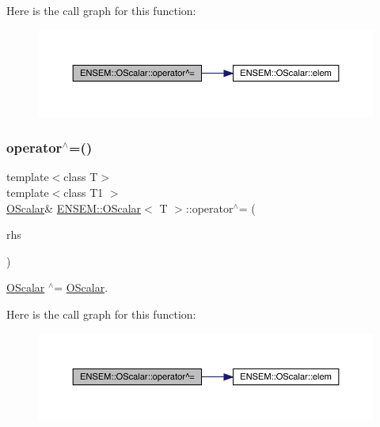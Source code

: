 Here is the call graph for this function\+:
\nopagebreak
\begin{figure}[H]
\begin{center}
\leavevmode
\includegraphics[width=350pt]{da/d80/classENSEM_1_1OScalar_af66decef8e6be220193ad1292a927e2f_cgraph}
\end{center}
\end{figure}
\mbox{\label{classENSEM_1_1OScalar_af66decef8e6be220193ad1292a927e2f}} 
\subsubsection{\texorpdfstring{operator$^\wedge$=()}{operator^=()}\hspace{0.1cm}{\footnotesize\ttfamily [2/3]}}
{\footnotesize\ttfamily template$<$class T$>$ \\
template$<$class T1 $>$ \\
\mbox{\hyperlink{classENSEM_1_1OScalar}{O\+Scalar}}\& \mbox{\hyperlink{classENSEM_1_1OScalar}{E\+N\+S\+E\+M\+::\+O\+Scalar}}$<$ T $>$\+::operator$^\wedge$= (\begin{DoxyParamCaption}\item[{const \mbox{\hyperlink{classENSEM_1_1OScalar}{O\+Scalar}}$<$ T1 $>$ \&}]{rhs }\end{DoxyParamCaption})\hspace{0.3cm}{\ttfamily [inline]}}



\mbox{\hyperlink{classENSEM_1_1OScalar}{O\+Scalar}} $^\wedge$= \mbox{\hyperlink{classENSEM_1_1OScalar}{O\+Scalar}}. 

Here is the call graph for this function\+:
\nopagebreak
\begin{figure}[H]
\begin{center}
\leavevmode
\includegraphics[width=350pt]{da/d80/classENSEM_1_1OScalar_af66decef8e6be220193ad1292a927e2f_cgraph}
\end{center}
\end{figure}
\mbox{\label{classENSEM_1_1OScalar_af66decef8e6be220193ad1292a927e2f}} 
